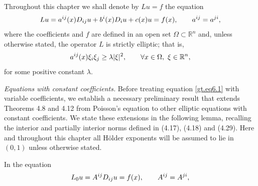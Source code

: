 Throughout this chapter we shall denote by $Lu=f$ the equation
\begin{equation}\label{gt.eq6.1}\dcref{(6.1)}\group{chapter-6}\source{gilbarg-trudinger:page-0099}
Lu=a^{ij}(x)D_{ij}u+b^i(x)D_i u+c(x)u=f(x),\qquad a^{ij}=a^{ji},
\end{equation}
where the coefficients and $f$ are defined in an open set $\Omega\subset \mathbb{R}^n$ and, unless otherwise stated, the operator $L$ is strictly elliptic; that is,
\begin{equation}\label{gt.eq6.2}\dcref{(6.2)}\group{chapter-6}\source{gilbarg-trudinger:page-0099}
a^{ij}(x)\xi_i\xi_j\geq \lambda|\xi|^2,\qquad \forall x\in\Omega,\ \xi\in \mathbb{R}^n,
\end{equation}
for some positive constant $\lambda$.

\medskip

\noindent\textit{Equations with constant coefficients.} Before treating equation \eqref{gt.eq6.1} with variable coefficients, we establish a necessary preliminary result that extends Theorems 4.8 and 4.12 from Poisson's equation to other elliptic equations with constant coefficients. We state these extensions in the following lemma, recalling the interior and partially interior norms defined in (4.17), (4.18) and (4.29). Here and throughout this chapter all H\"older exponents will be assumed to lie in $(0,1)$ unless otherwise stated.

\medskip

\begin{lemma}\label{gt.lem6.1}
In the equation
\begin{equation}\label{gt.eq6.3}\dcref{(6.3)}\group{chapter-6}\source{gilbarg-trudinger:page-0099}
L_0u=A^{ij}D_{ij}u=f(x),\qquad A^{ij}=A^{ji},
\end{equation}
\end{lemma}
